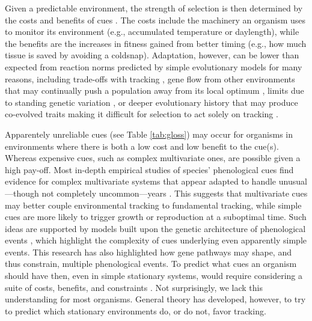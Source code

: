 \documentclass[11pt,letterpaper]{article}
\newcommand{\R}[1]{\label{}\linelabel{#1}}
\begin{document}
Given a predictable environment, the strength of selection is then determined by the costs and benefits of cues \citep{donahue2015}. The costs include the machinery an organism uses to monitor its environment (e.g., accumulated temperature or daylength), while the benefits are the increases in fitness gained from better timing (e.g., how much tissue is saved by avoiding a coldsnap).  Adaptation, however, can be lower than expected from reaction norms predicted by simple evolutionary models for many reasons, including trade-offs with tracking \citep{Singer:2010eb,Johansson2012}, gene flow from other environments that may continually push a population away from its local optimum \citep{lenormand2002}, limits due to standing genetic variation  \citep{Franks:2007wd,ghalambor2015}, or deeper evolutionary history that may produce co-evolved traits making it difficult for selection to act solely on tracking \citep{Ackerly:2009ly}. 

Apparentely unreliable cues (see Table \ref{tab:gloss}) may occur for organisms in environments where there is both a low cost and low benefit to the cue(s). Whereas expensive cues, such as complex multivariate ones, are possible given a high pay-off. Most in-depth empirical studies of species' phenological cues find evidence for complex multivariate systems that appear adapted to handle unusual---though not completely uncommon---years \citep{chuinearees}.  This suggests that multivariate cues may better couple environmental tracking to fundamental tracking, while simple cues are more likely to trigger growth or reproduction at a suboptimal time. \R{r2wantsmore}Such ideas are supported by models built upon the genetic architecture of phenological events \citep[e.g.,][]{Wilczek:2010ad}, which highlight the complexity of cues underlying even apparently simple events. This research has also highlighted how gene pathways may shape, and thus constrain, multiple phenological events. To predict what cues an organism should have then, even in simple stationary systems, would require considering a suite of costs, benefits, and constraints \citep{donahue2015,bonamour2019}. Not surprisingly, we lack this understanding for most organisms. General theory has developed, however, to try to predict which stationary environments do, or do not, favor tracking.\R{r2wantsmoreend}
\end{document}
